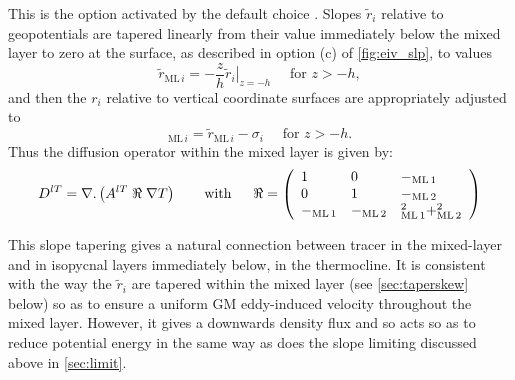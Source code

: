 \documentclass[../main/NEMO_manual]{subfiles}
\newcommand{\rML}[1][i]{\ensuremath{_{\mathrm{ML}\,#1}}}
\newcommand{\rMLt}[1][i]{\tilde{r}_{\mathrm{ML}\,#1}}
\begin{document}
This is the option activated by the default choice .
Slopes $\tilde{r}_i$ relative to geopotentials are tapered linearly from their value immediately below
the mixed layer to zero at the surface, as described in option (c) of \autoref{fig:eiv_slp}, to values
\begin{equation}
  \label{eq:rmtilde}
  \rMLt = -\frac{z}{h}\left.\tilde{r}_i\right|_{z=-h}\quad \text{ for  } z>-h,
\end{equation}
and then the $r_i$ relative to vertical coordinate surfaces are appropriately adjusted to
\[
  \rML =\rMLt -\sigma_i \quad \text{ for  } z>-h.
\]
Thus the diffusion operator within the mixed layer is given by:
\[
  D^{lT}=\nabla {\rm {\bf .}}\left( {A^{lT}\;\Re \;\nabla T} \right) \qquad
  \mbox{with}\quad \;\;\Re =\left( {{
        \begin{array}{*{20}c}
          1 \hfill & 0 \hfill & {-\rML[1]}\hfill \\
          0 \hfill & 1 \hfill & {-\rML[2]} \hfill \\
          {-\rML[1]}\hfill &   {-\rML[2]} \hfill & {\rML[1]^2+\rML[2]^2} \hfill
        \end{array}
      }} \right)
\]

This slope tapering gives a natural connection between tracer in the mixed-layer and
in isopycnal layers immediately below, in the thermocline.
It is consistent with the way the $\tilde{r}_i$ are tapered within the mixed layer
(see \autoref{sec:taperskew} below) so as to ensure a uniform GM eddy-induced velocity throughout the mixed layer.
However, it gives a downwards density flux and so acts so as to reduce potential energy in the same way as
does the slope limiting discussed above in \autoref{sec:limit}.
 
\end{document}
